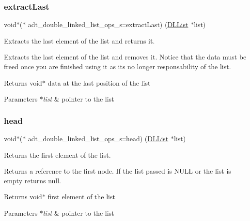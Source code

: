 \subsubsection{\texorpdfstring{extract\+Last}{extractLast}}
{\footnotesize\ttfamily void$\ast$($\ast$ adt\+\_\+double\+\_\+linked\+\_\+list\+\_\+ops\+\_\+s\+::extract\+Last) (\hyperlink{structadt__double__linked__list__s}{D\+L\+List} $\ast$list)}



Extracts the last element of the list and returns it. 

Extracts the last element of the list and removes it. Notice that the data must be freed once you are finished using it as it\textquotesingle{}s no longer responsability of the list.

\begin{DoxyReturn}{Returns}
void$\ast$ data at the last position of the list 
\end{DoxyReturn}

\begin{DoxyParams}{Parameters}
{\em $\ast$list} & pointer to the list \\
\hline
\end{DoxyParams}
\mbox{\label{structadt__double__linked__list__ops__s_acb2435ff509e9edc4f8651e17e5c54ab}} 
\subsubsection{\texorpdfstring{head}{head}}
{\footnotesize\ttfamily void$\ast$($\ast$ adt\+\_\+double\+\_\+linked\+\_\+list\+\_\+ops\+\_\+s\+::head) (\hyperlink{structadt__double__linked__list__s}{D\+L\+List} $\ast$list)}



Returns the first element of the list. 

Returns a reference to the first node. If the list passed is N\+U\+LL or the list is empty returns null.

\begin{DoxyReturn}{Returns}
void$\ast$ first element of the list 
\end{DoxyReturn}

\begin{DoxyParams}{Parameters}
{\em $\ast$list} & pointer to the list \\
\hline
\end{DoxyParams}
\mbox{\label{structadt__double__linked__list__ops__s_a6ee8a6635bd532cd18304937ee45f374}} 
